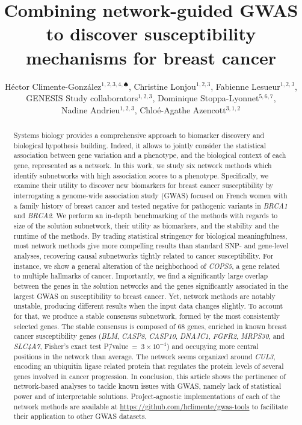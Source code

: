 \documentclass[twocolumn, 11pt]{article}
\title{Combining network-guided GWAS to discover susceptibility mechanisms for breast cancer}
\author{Héctor Climente-González$^{1,2,3,4,\spadesuit}$, Christine Lonjou$^{1,2,3}$, Fabienne Lesueur$^{1,2,3}$, \\
GENESIS Study collaborators$^{1,2,3}$, Dominique Stoppa-Lyonnet$^{5,6,7}$, \\
Nadine Andrieu$^{1,2,3}$, Chloé-Agathe Azencott$^{3,1,2}$}
\date{\small{
  \raggedright{
  $^{1}$Institut Curie, PSL Research University, F-75005 Paris, France;\\
  $^{2}$INSERM, U900, F-75005 Paris, France;\\
  $^{3}$MINES ParisTech, PSL Research University, CBIO-Centre for Computational Biology, F-75006 Paris, France;\\
  $^{4}$RIKEN Center for Advanced Intelligence Project (AIP), Tokyo, 103-0027, Japan; \\
  $^{5}$Service de Génétique, Institut Curie, F-75005 Paris, France;\\
  $^{6}$INSERM, U830, F-75005 Paris, France;\\
  $^{7}$Université Paris Descartes.\\
  }
  \raggedright{$^{\spadesuit}$Corresponding author: \href{hector.climente@riken.jp}{hector.climente@riken.jp}\\}
}
}
\begin{document}
\onecolumn
\maketitle

\begin{abstract}
Systems biology provides a comprehensive approach to biomarker discovery and biological hypothesis building. Indeed, it allows to jointly consider the statistical association between gene variation and a phenotype, and the biological context of each gene, represented as a network. In this work, we study six network methods which identify subnetworks with high association scores to a phenotype. Specifically, we examine their utility to discover new biomarkers for breast cancer susceptibility by interrogating a genome-wide association study (GWAS) focused on French women with a family history of breast cancer and tested negative for pathogenic variants in \emph{BRCA1} and \emph{BRCA2}. We perform an in-depth benchmarking of the methods with regards to size of the solution subnetwork, their utility as biomarkers, and the stability and the runtime of the methods. By trading statistical stringency for biological meaningfulness, most network methods give more compelling results than standard SNP- and gene-level analyses, recovering causal subnetworks tightly related to cancer susceptibility. For instance, we show a general alteration of the neighborhood of \emph{COPS5}, a gene related to multiple hallmarks of cancer. Importantly, we find a significantly large overlap between the genes in the solution networks and the genes significantly associated in the largest GWAS on susceptibility to breast cancer. Yet, network methods are notably unstable, producing different results when the input data changes slightly. To account for that, we produce a stable consensus subnetwork, formed by the most consistently selected genes. The stable consensus is composed of 68 genes, enriched in known breast cancer susceptibility genes (\emph{BLM}, \emph{CASP8}, \emph{CASP10}, \emph{DNAJC1}, \emph{FGFR2}, \emph{MRPS30}, and \emph{SLC4A7}, Fisher's exact test P\=/value~=~$3 \times 10^{-4}$) and occupying more central positions in the network than average. The network seems organized around \emph{CUL3}, encoding an ubiquitin ligase related protein that regulates the protein levels of several genes involved in cancer progression. In conclusion, this article shows the pertinence of network-based analyses to tackle known issues with GWAS, namely lack of statistical power and of interpretable solutions. Project-agnostic implementations of each of the network methods are available at \url{https://github.com/hclimente/gwas-tools} to facilitate their application to other GWAS datasets.
\end{abstract}
\end{document}

